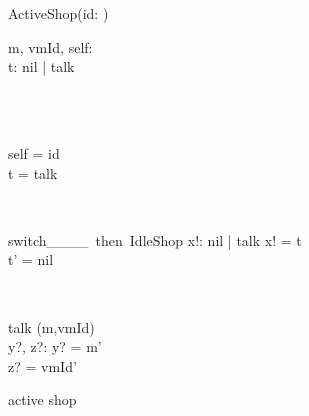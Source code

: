 \begin{figure}[H]
\centering
\begin{class}{ActiveShop(id: \integer)}
\\
\begin{state}
m, vmId, self: \integer
\\t: nil | talk
\end{state} 
\\
\begin{init}
\\self = id
\\t = talk
\end{init} 
\\
\begin{op}{switch\_\_\_\_\ then\ IdleShop}
x!: nil | talk
\ST
x! = t
\\t' = nil
\end{op}
\\
\begin{op}{talk}
\Delta (m,vmId)
\\y?, z?: \integer
\ST
y? = m'
\\z? = vmId'
\end{op}
\end{class}
\caption{active shop}
\label{fig_oz_active_shop}
\end{figure}